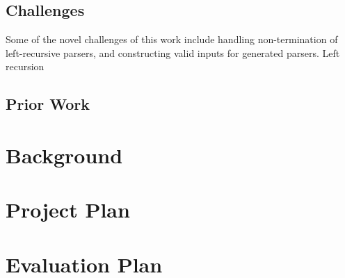 \documentclass{article}
\begin{document}
\subsection{Challenges}

Some of the novel challenges of this work include handling non-termination of left-recursive parsers, and constructing valid inputs for generated parsers. Left recursion 
\cite{left-recursive}

\subsection{Prior Work}
\cite{left-recursive-detect}


\section{Background} %

\section{Project Plan} %

\section{Evaluation Plan} %


\raggedright

\end{document}
